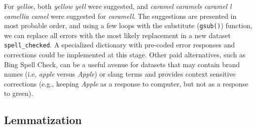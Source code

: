 \documentclass[man]{apa6}
\newenvironment{Shaded}{\begin{snugshade}}{\end{snugshade}}
\newcommand{\CommentTok}[1]{\textcolor[rgb]{0.56,0.35,0.01}{\textit{#1}}}
\newcommand{\ControlFlowTok}[1]{\textcolor[rgb]{0.13,0.29,0.53}{\textbf{#1}}}
\newcommand{\DecValTok}[1]{\textcolor[rgb]{0.00,0.00,0.81}{#1}}
\newcommand{\KeywordTok}[1]{\textcolor[rgb]{0.13,0.29,0.53}{\textbf{#1}}}
\newcommand{\NormalTok}[1]{#1}
\newcommand{\OperatorTok}[1]{\textcolor[rgb]{0.81,0.36,0.00}{\textbf{#1}}}
\newcommand{\StringTok}[1]{\textcolor[rgb]{0.31,0.60,0.02}{#1}}
\begin{document}
\normalsize

For \emph{yelloe}, both \emph{yellow yell} were suggested, and \emph{caramel caramels caramel l camellia camel} were suggested for \emph{caramell}. The suggestions are presented in most probable order, and using a few loops with the substitute (\texttt{gsub()}) function, we can replace all errors with the most likely replacement in a new dataset \texttt{spell\_checked}. A specialized dictionary with pre-coded error responses and corrections could be implemented at this stage. Other paid alternatives, such as Bing Spell Check, can be a useful avenue for datasets that may contain brand names (i.e, \emph{apple} versus \emph{Apple}) or slang terms and provides context sensitive corrections (e.g., keeping \emph{Apple} as a response to computer, but not as a response to green).

\scriptsize

\begin{Shaded}
\end{Shaded}

\normalsize

\hypertarget{lemmatization}{%
\subsection{Lemmatization}\label{lemmatization}}
\end{document}
